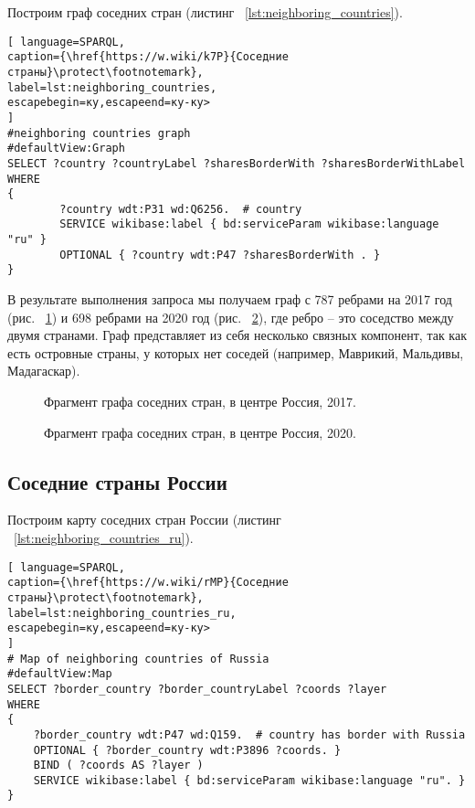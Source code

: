 Построим граф соседних стран (листинг ~\ref{lst:neighboring_countries}).
\begin{lstlisting}[ language=SPARQL, 
caption={\href{https://w.wiki/k7P}{Соседние страны}\protect\footnotemark},
label=lst:neighboring_countries, 
escapebegin=ку,escapeend=ку-ку>
]
#neighboring countries graph
#defaultView:Graph
SELECT ?country ?countryLabel ?sharesBorderWith ?sharesBorderWithLabel
WHERE
{
		?country wdt:P31 wd:Q6256.	# country
		SERVICE wikibase:label { bd:serviceParam wikibase:language "ru" }
		OPTIONAL { ?country wdt:P47 ?sharesBorderWith . }
}
\end{lstlisting}


В результате выполнения запроса мы получаем граф с 787 ребрами на 2017 год (рис. ~\ref{fig:neighboring_countries_2017}) и 698 ребрами на 2020 год (рис. ~\ref{fig:neighboring_countries_2020}), где ребро – это соседство между двумя странами. Граф представляет из себя несколько связных компонент, так как есть островные страны, у которых нет соседей (например, Маврикий, Мальдивы, Мадагаскар).

\begin{figure}
	{
		\setlength{\fboxsep}{0pt}%
		\setlength{\fboxrule}{1pt}%
	}
	\caption{Фрагмент графа соседних стран, в центре Россия, 2017.
	}%
	\label{fig:neighboring_countries_2017}%
\end{figure}

\begin{figure}
	{
		\setlength{\fboxsep}{0pt}%
		\setlength{\fboxrule}{1pt}%
	}
	\caption{Фрагмент графа соседних стран, в центре Россия, 2020.
	}%
	\label{fig:neighboring_countries_2020}%
\end{figure}

\subsection{Соседние страны России}

Построим карту соседних стран России (листинг ~\ref{lst:neighboring_countries_ru}).
\begin{lstlisting}[ language=SPARQL, 
caption={\href{https://w.wiki/rMP}{Соседние страны}\protect\footnotemark},
label=lst:neighboring_countries_ru, 
escapebegin=ку,escapeend=ку-ку>
]
# Map of neighboring countries of Russia
#defaultView:Map
SELECT ?border_country ?border_countryLabel ?coords ?layer
WHERE 
{
	?border_country wdt:P47 wd:Q159.  # country has border with Russia
	OPTIONAL { ?border_country wdt:P3896 ?coords. }
	BIND ( ?coords AS ?layer )
	SERVICE wikibase:label { bd:serviceParam wikibase:language "ru". }
}
\end{lstlisting}

